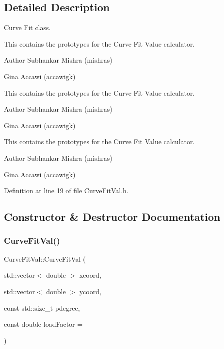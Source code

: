 \subsection{Detailed Description}
Curve Fit class. 

This contains the prototypes for the Curve Fit Value calculator.

\begin{DoxyAuthor}{Author}
Subhankar Mishra (mishras) 

Gina Accawi (accawigk) 
\end{DoxyAuthor}


This contains the prototypes for the Curve Fit Value calculator.

\begin{DoxyAuthor}{Author}
Subhankar Mishra (mishras) 

Gina Accawi (accawigk) 
\end{DoxyAuthor}


This contains the prototypes for the Curve Fit Value calculator.

\begin{DoxyAuthor}{Author}
Subhankar Mishra (mishras) 

Gina Accawi (accawigk) 
\end{DoxyAuthor}


Definition at line 19 of file Curve\+Fit\+Val.\+h.



\subsection{Constructor \& Destructor Documentation}
\mbox{\label{class_curve_fit_val_ab7e5e250ea748ec116e2720b85a01853}} 
\subsubsection{\texorpdfstring{Curve\+Fit\+Val()}{CurveFitVal()}\hspace{0.1cm}{\footnotesize\ttfamily [1/3]}}
{\footnotesize\ttfamily Curve\+Fit\+Val\+::\+Curve\+Fit\+Val (\begin{DoxyParamCaption}\item[{std\+::vector$<$ double $>$}]{xcoord,  }\item[{std\+::vector$<$ double $>$}]{ycoord,  }\item[{const std\+::size\+\_\+t}]{pdegree,  }\item[{const double}]{load\+Factor = {} }\end{DoxyParamCaption})\hspace{0.3cm}{\ttfamily [inline]}}

